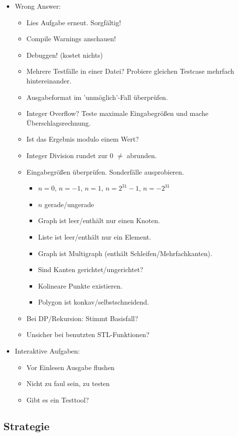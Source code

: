 \begin{itemize}
	\item Wrong Answer:
	\begin{itemize}
		\item Lies Aufgabe erneut. Sorgfältig!
		\item Compile Warnings anschauen!
		\item Debuggen! (kostet nichts)
		\item Mehrere Testfälle in einer Datei? Probiere gleichen Testcase mehrfach hintereinander.
		\item Ausgabeformat im 'unmöglich'-Fall überprüfen.
		\item Integer Overflow? Teste maximale Eingabegrößen und mache Überschlagsrechnung.
		\item Ist das Ergebnis modulo einem Wert?
		\item Integer Division rundet zur $0$ $\neq$ abrunden.
		\item Eingabegrößen überprüfen. Sonderfälle ausprobieren.
		\begin{itemize}
			\item $n = 0$, $n = -1$, $n = 1$, $n = 2^{31}-1$, $n = -2^{31}$
			\item $n$ gerade/ungerade
			\item Graph ist leer/enthält nur einen Knoten.
			\item Liste ist leer/enthält nur ein Element.
			\item Graph ist Multigraph (enthält Schleifen/Mehrfachkanten).
			\item Sind Kanten gerichtet/ungerichtet?
			\item Kolineare Punkte existieren.
			\item Polygon ist konkav/selbstschneidend.
		\end{itemize}
		\item Bei DP/Rekursion: Stimmt Basisfall?
		\item Unsicher bei benutzten STL-Funktionen?
	\end{itemize}

	\item Interaktive Aufgaben:
	\begin{itemize}
		\item Vor Einlesen Ausgabe flushen
		\item Nicht zu faul sein, zu testen
		\item Gibt es ein Testtool?
	\end{itemize}
\end{itemize}

\columnbreak
\subsection{Strategie}


